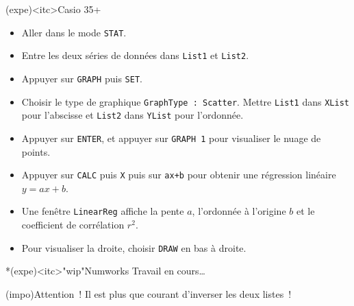 \documentclass[a4paper, 12pt, garamond]{book}
\begin{document}
\begin{tcb}[breakable](expe)<itc>{Casio 35+}
	\begin{itemize}[leftmargin=10pt]
		\item Aller dans le mode \texttt{STAT}.
		\item Entre les deux séries de données dans \texttt{List1} et
		      \texttt{List2}.
		\item Appuyer sur \texttt{GRAPH} puis \texttt{SET}.
		\item Choisir le type de graphique \texttt{GraphType~: Scatter}. Mettre
		      \texttt{List1} dans \texttt{XList} pour l'abscisse et \texttt{List2}
		      dans \texttt{YList} pour l'ordonnée.
		\item Appuyer sur \texttt{ENTER}, et appuyer sur \texttt{GRAPH 1} pour
		      visualiser le nuage de points.
		\item Appuyer sur \texttt{CALC} puis \texttt{X} puis sur \texttt{ax+b} pour
		      obtenir une régression linéaire $y = ax+b$.
		\item Une fenêtre \texttt{LinearReg} affiche la pente $a$, l'ordonnée à
		      l'origine $b$ et le coefficient de corrélation $r^{2}$.
		\item Pour visualiser la droite, choisir \texttt{DRAW} en bas à droite.
	\end{itemize}
\end{tcb}

\begin{tcb}*(expe)<itc>"wip"{Numworks}
	Travail en cours…
	\vfill
\end{tcb}

\begin{tcb}(impo){Attention~!}
	Il est plus que courant d'inverser les deux listes~!
\end{tcb}
\end{document}
